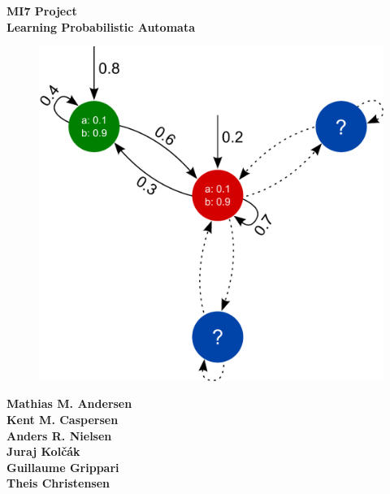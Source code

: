\begin{titlepage}
	\begin{center}
		\textup{\small {\bf MI7 Project}}\\[0.2in]	
		\Large \textbf {Learning Probabilistic Automata}\\[0.5in]
		
		\begin{figure}[!h]
			\centering
			\includegraphics[width=1\linewidth]{pictures/frontpagemodel.pdf}
			\label{fig:Frontpage}
		\end{figure}
	\end{center}
	\begin{centering}
	\textbf{Mathias M. Andersen\\
	Kent M. Caspersen\\
	Anders R. Nielsen\\
	Juraj Kol\v{c}\'{a}k\\
	Guillaume Grippari\\
	Theis Christensen\\}
	\end{centering}		
	
\end{titlepage}
